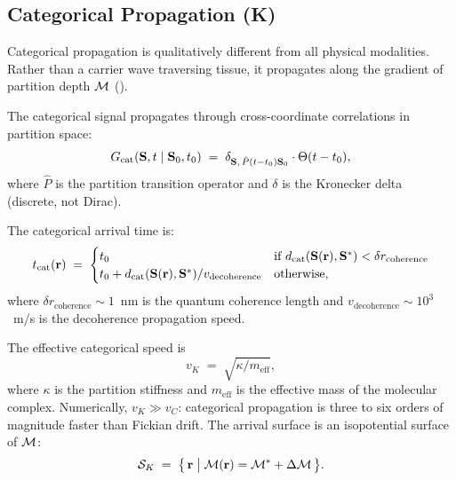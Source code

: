 \subsection{Categorical Propagation (K)}

Categorical propagation is qualitatively different from all physical modalities.
Rather than a carrier wave traversing tissue, it propagates along the gradient
of partition depth $\mathcal{M}$ ().

\begin{definition}
The categorical signal propagates through cross-coordinate correlations in
partition space:
\begin{equation}
    G_\mathrm{cat}(\mathbf{S}, t \mid \mathbf{S}_0, t_0)
    \;=\; \delta_{\mathbf{S},\, \hat{P}(t-t_0)\mathbf{S}_0} \cdot \Theta(t - t_0),
\end{equation}
where $\hat{P}$ is the partition transition operator and $\delta$ is the
Kronecker delta (discrete, not Dirac).
\end{definition}

The categorical arrival time is:
\begin{equation}
    t_\mathrm{cat}(\mathbf{r})
    \;=\;
    \begin{cases}
        t_0 & \text{if } d_{\mathrm{cat}}(\mathbf{S}(\mathbf{r}), \mathbf{S}^*)
               < \delta r_\mathrm{coherence} \\
        t_0 + d_{\mathrm{cat}}(\mathbf{S}(\mathbf{r}), \mathbf{S}^*) / v_\mathrm{decoherence}
             & \text{otherwise,}
    \end{cases}
    \label{eq:tcat}
\end{equation}
where $\delta r_\mathrm{coherence} \sim 1$~nm is the quantum coherence length
and $v_\mathrm{decoherence} \sim 10^3$~m/s is the decoherence propagation
speed.

The effective categorical speed is
\begin{equation}
  v_K \;=\; \sqrt{\kappa / m_{\mathrm{eff}}},
  \label{eq:vK}
\end{equation}
where $\kappa$ is the partition stiffness and $m_{\mathrm{eff}}$ is the
effective mass of the molecular complex.  Numerically, $v_K \gg v_C$:
categorical propagation is three to six orders of magnitude faster than
Fickian drift.  The arrival surface is an isopotential surface of $\mathcal{M}$:
\begin{equation}
  \mathcal{S}_K
  \;=\; \bigl\{\,\mathbf{r} \;\big|\;
        \mathcal{M}(\mathbf{r}) = \mathcal{M}^{*} + \Delta\mathcal{M}\,\bigr\}.
  \label{eq:SK}
\end{equation}

